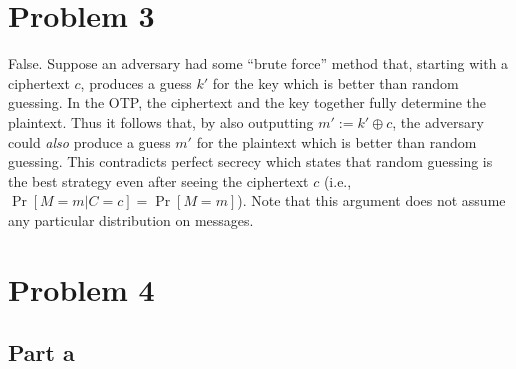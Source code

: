 \documentclass{article}
\begin{document}
\section*{Problem 3}

False. Suppose an adversary had some ``brute force'' method that, starting with a ciphertext $c$, produces a guess $k'$ for the key which is better than random guessing. In the OTP, the ciphertext and the key together fully determine the plaintext. Thus it follows that, by also outputting $m' := k' \oplus c$, the adversary could \emph{also} produce a guess $m'$ for the plaintext which is better than random guessing. This contradicts perfect secrecy which states that random guessing is the best strategy even after seeing the ciphertext $c$ (i.e., $\Pr[M=m | C=c] = \Pr[M=m]$). Note that this argument does not assume any particular distribution on messages.




\section*{Problem 4}

\subsection*{Part a}
\end{document}
